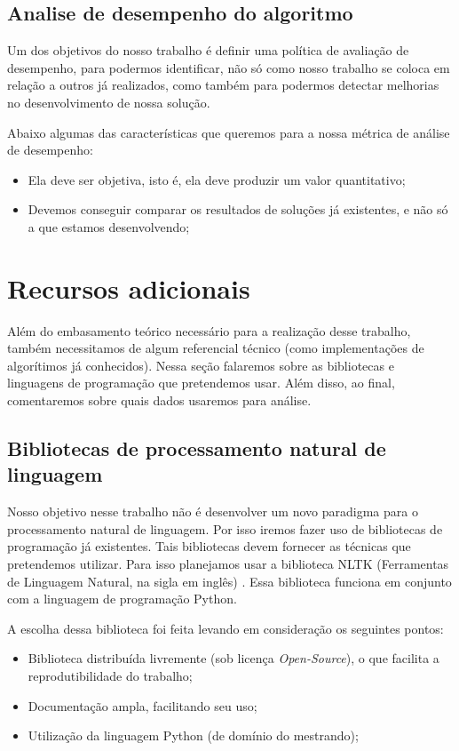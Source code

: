 \documentclass[
	12pt,				%
	openright,			%
	twoside,			%
	a4paper,			%
	english,			%
	spanish,			%
	brazil,				%
	]{abntex2}
\begin{document}
\subsection{Analise de desempenho do algoritmo}

Um dos objetivos do nosso trabalho é definir uma política de avaliação de desempenho, para podermos identificar, não só como nosso trabalho se coloca em relação a outros já realizados, como também para podermos detectar melhorias no desenvolvimento de nossa solução.

Abaixo algumas das características que queremos para a nossa métrica de análise de desempenho:

\begin{itemize}
	\item Ela deve ser objetiva, isto é, ela deve produzir um valor quantitativo;
	\item Devemos conseguir comparar os resultados de soluções já existentes, e não só a que estamos desenvolvendo;
\end{itemize}

\section{Recursos adicionais}
Além do embasamento teórico necessário para a realização desse trabalho, também necessitamos de algum referencial técnico (como implementações de algorítimos já conhecidos). Nessa seção falaremos sobre as bibliotecas e linguagens de programação que pretendemos usar. Além disso, ao final, comentaremos sobre quais dados usaremos para análise.

\subsection{Bibliotecas de processamento natural de linguagem}

Nosso objetivo nesse trabalho não é desenvolver um novo paradigma para o processamento natural de linguagem. Por isso iremos fazer uso de bibliotecas de programação já existentes. Tais bibliotecas devem fornecer as técnicas que pretendemos utilizar. Para isso planejamos usar a biblioteca NLTK (Ferramentas de Linguagem Natural, na sigla em inglês) \cite{bird2009natural}. Essa biblioteca funciona em conjunto com a linguagem de programação Python.

A escolha dessa biblioteca foi feita levando em consideração os seguintes pontos:

\begin{itemize}
	\item Biblioteca distribuída livremente (sob licença \emph{Open-Source}), o que facilita a reprodutibilidade do trabalho;
	\item Documentação ampla, facilitando seu uso;
	\item Utilização da linguagem Python (de domínio do mestrando);
\end{itemize}
\end{document}
